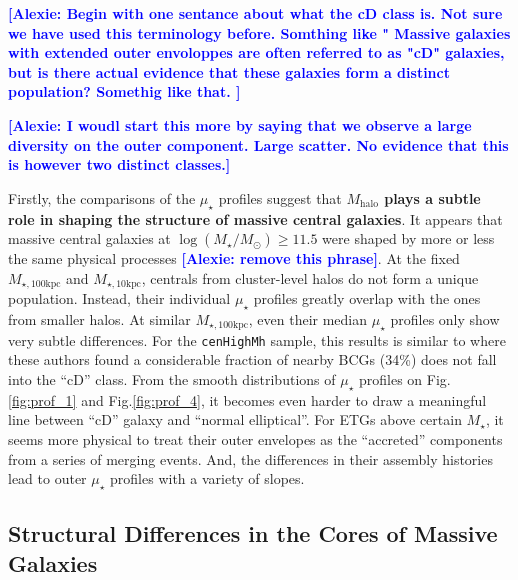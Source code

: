\documentclass{emulateapj}
\def\rbcg{\texttt{cenHighMh}}
\def\mstar{{$M_{\star}$}}
\def\mhalo{{$M_{\mathrm{halo}}$}}
\def\logms{{$\log (M_{\star}/M_{\odot})$}}
\def\minn{{$M_{\star,10\mathrm{kpc}}$}}
\def\mtot{{$M_{\star,100\mathrm{kpc}}$}}
\def\mden{{$\mu_{\star}$}}
\newcommand{\alexie}[1]{\textcolor{blue}{\textbf{[Alexie: #1]}}}
\newcommand{\update}[1]{\textcolor{Bittersweet}{#1}}
\begin{document}
\begin{CJK*}{UTF8}{gbsn}
    \alexie{Begin with one sentance about what the cD class is. Not sure we have used this terminology before. Somthing like " Massive galaxies with extended outer envoloppes are often referred to as "cD" galaxies, but is there actual evidence that these galaxies form a distinct population? Somethig like that. }
    
    \alexie{I woudl start this more by saying that we observe a large diversity on the outer component. Large scatter. No evidence that this is however two distinct classes.}
    
    Firstly, the comparisons of the \mden{} profiles suggest that \textbf{\mhalo{} plays
    a subtle role in shaping the structure of massive central galaxies}.  
    It appears that massive central galaxies at \logms{}$\geq 11.5$ were shaped by more 
    or less the same physical processes \alexie{remove this phrase}.  
    At the fixed \mtot{} and \minn{}, centrals from cluster-level halos do not form a 
    unique population. 
    Instead, their individual \mden{} profiles greatly overlap with the ones from smaller 
    halos.
    At similar \mtot{}, even their median \mden{} profiles only show very subtle 
    differences. 
    For the \rbcg{} sample, this results is similar to \citep{Zhao2015} where these 
    authors found a considerable fraction of nearby BCGs (34\%) does not fall into 
    the ``cD'' class.
    \update{
    From the smooth distributions of \mden{} profiles on Fig.\ref{fig:prof_1} 
    and Fig.\ref{fig:prof_4}, it becomes even harder to draw a meaningful line  
    between ``cD'' galaxy and ``normal elliptical''. 
    For ETGs above certain \mstar{}, it seems more physical to treat their outer 
    envelopes as the ``accreted'' components from a series of merging events. 
    And, the differences in their assembly histories lead to outer \mden{} profiles 
    with a variety of slopes. 
    }
    
    
\subsection{Structural Differences in the Cores of Massive Galaxies}
    

\end{CJK*}
\end{document}
